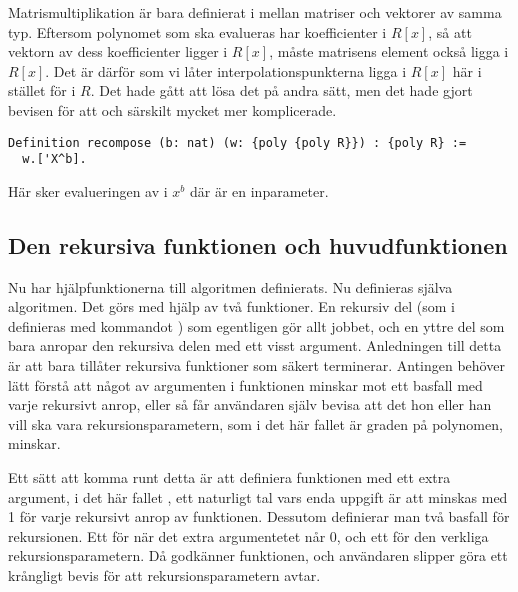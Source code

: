 Matrismultiplikation är bara definierat i \ssr{} mellan matriser och vektorer av
samma typ. Eftersom polynomet  som ska evalueras har koefficienter i
$R[x]$, så att vektorn av dess koefficienter ligger i $R[x]$, måste matrisens
element också ligga i $R[x]$. Det är därför som vi låter
interpolationspunkterna ligga i $R[x]$ här i stället för i $R$. Det hade gått
att lösa det på andra sätt, men det hade gjort bevisen för att  och
särskilt  mycket mer komplicerade.

\begin{lstlisting}
Definition recompose (b: nat) (w: {poly {poly R}}) : {poly R} :=
  w.['X^b].
\end{lstlisting}
Här sker evalueringen av  i $x^b$ där  är en inparameter.

\subsection{Den rekursiva funktionen och huvudfunktionen}
\label{sec:formrec}

Nu har hjälpfunktionerna till algoritmen definierats. Nu definieras själva
algoritmen. Det görs med hjälp av två funktioner. En rekursiv del (som i \coq{}
definieras med kommandot ) som egentligen gör allt jobbet, och en
yttre del som bara anropar den rekursiva delen med ett visst argument.
Anledningen till detta är att \coq{} bara tillåter rekursiva funktioner som
säkert terminerar. Antingen behöver \coq{} lätt förstå att något av argumenten
i funktionen minskar mot ett basfall med varje rekursivt anrop, eller så får
användaren själv bevisa att det hon eller han vill ska vara
rekursionsparametern, som i det här fallet är graden på polynomen, minskar.

Ett sätt att komma runt detta är att definiera funktionen med ett extra
argument, i det här fallet , ett naturligt tal vars enda uppgift är att
minskas med 1 för varje rekursivt anrop av funktionen. Dessutom definierar man
två basfall för rekursionen. Ett för när det extra argumentetet  når 0,
och ett för den verkliga rekursionsparametern. Då godkänner \coq{} funktionen,
och användaren slipper göra ett krångligt bevis för att rekursionsparametern
avtar.

